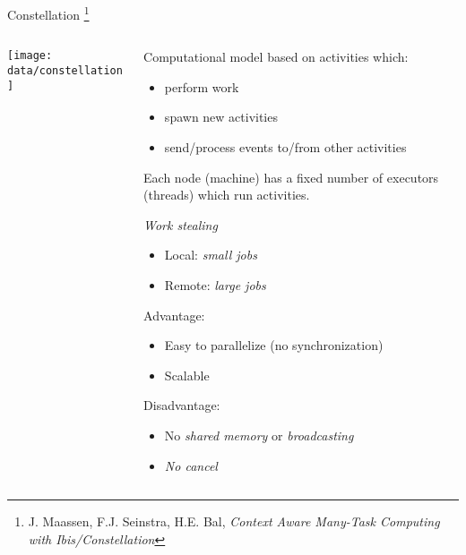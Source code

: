 \documentclass[mathserif,serif]{beamer}
\begin{document}
\begin{frame}{Constellation}
  \let\thefootnote\relax\footnote{J. Maassen, F.J. Seinstra, H.E. Bal,
  \emph{Context Aware Many-Task Computing with Ibis/Constellation}}

  \begin{columns}[t]
    \begin{column}[T]{0.3\textwidth}
      \centering
      \texttt{[image: data/constellation]}
    \end{column}

    \begin{column}[T]{0.7\textwidth}
      \begin{itemize}
         {
          \item Computational model based on activities which:
          \begin{itemize}
            \item perform work
            \item spawn new activities
            \item send/process events to/from other activities
          \end{itemize}
        }

         {
          \item Each node (machine) has a fixed number of executors
          (threads) which run activities.
          \item \emph{Work stealing}
          \begin{itemize}
            \item Local: \emph{small jobs}
            \item Remote: \emph{large jobs}
          \end{itemize}
        }

         {
          \item Advantage:
          \begin{itemize}
            \item Easy to parallelize (no synchronization)
            \item Scalable
          \end{itemize}
          \item Disadvantage:
          \begin{itemize}
            \item No \emph{shared memory} or \emph{broadcasting}
            \item \emph{No cancel}
          \end{itemize}
        }
      \end{itemize}
    \end{column}
  \end{columns}
\end{frame}
\end{document}

